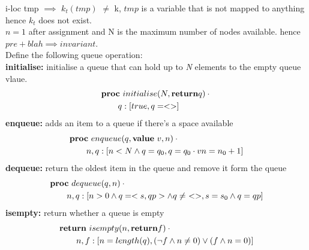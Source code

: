 \documentclass[headings=small,a4paper,12pt]{scrartcl}
\begin{document}
i-loc tmp $\implies$ $k_t(tmp)$ $\ne$ k, $tmp$ is a variable that is not mapped to anything hence $k_t$ does not exist.\\
$n =1$ after assignment and N is the maximum number of nodes available. hence $pre + blah \implies invariant$. \\

Define the following queue operation:\\
\textbf{initialise:} initialise a queue that can hold up to \textit{N} elements to the empty queue vlaue.
\begin{align*}
  &\text{\normalfont\bfseries proc}~initialise(N,\text{\normalfont\bfseries return} q)\cdot{}\\
  &\qquad q :[true, q = <>]\\
\end{align*}
\break
\textbf{enqueue:} adds an item to a queue if there's a space available 
\begin{align*}
  &\text{\normalfont\bfseries proc}~enqueue(q, \text{\normalfont\bfseries value}~v,n)\cdot{}\\
    &\qquad n,q:[n<N \wedge q=q_0,q=q_0\cdot{}v n = n_0 + 1]\\
\end{align*}
%
\textbf{dequeue:} return the oldest item in the queue and remove it form the queue\\
\begin{align*}
    &\text{\normalfont\bfseries proc}~dequeue(q, n)\cdot{}\\
    &\qquad n,q:[n>0\wedge q=<s,qp>\wedge q\ne~<>, s= s_0\wedge q = qp] 
\end{align*}
\break
\textbf{isempty:} return whether a queue is empty
\begin{align*}
  &\text{\normalfont\bfseries return}~isempty(n, \text{\normalfont\bfseries return} f)\cdot{}\\
    &\qquad {n,f:[n = length(q) ,(\neg f \wedge n \neq 0)\vee(f \wedge n = 0)]}\\
\end{align*}
\break
\end{document}
